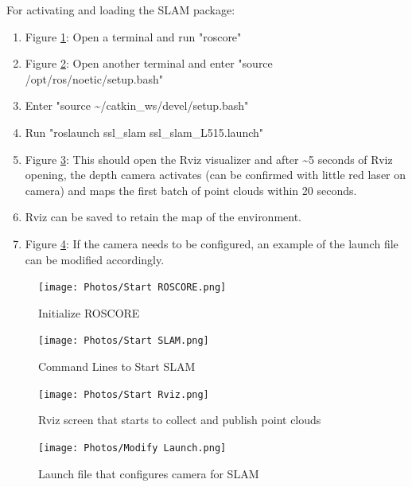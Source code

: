 \documentclass[a4paper, 10pt]{article}
\begin{document}
	For activating and loading the SLAM package:
	\begin{enumerate}
		\item Figure \ref{start_ROSCORE}: Open a terminal and run "roscore" 
		\item Figure \ref{start_SLAM}: Open another terminal and enter "source /opt/ros/noetic/setup.bash" 
		\item Enter "source \~{}/catkin\_{}ws/devel/setup.bash"
		\item Run "roslaunch ssl\_{}slam ssl\_{}slam\_{}L515.launch"
		\item Figure \ref{start_Rviz}: This should open the Rviz visualizer and after \~{}5 seconds of Rviz opening, the depth camera activates (can be confirmed with little red laser on camera) and maps the first batch of point clouds within 20 seconds.
		\item Rviz can be saved to retain the map of the environment. 
		\item Figure \ref{modify_launch}: If the camera needs to be configured, an example of the launch file can be modified accordingly.
	\end{enumerate}

	\begin{figure} [!h]
		\centering
		\texttt{[image: Photos/Start ROSCORE.png]}
		\caption{Initialize ROSCORE}
		\label{start_ROSCORE}
	\end{figure}
		
	\begin{figure} [!h]
		\centering
		\texttt{[image: Photos/Start SLAM.png]}
		\caption{Command Lines to Start SLAM}
		\label{start_SLAM}
	\end{figure}
	
	\begin{figure} [!h]
		\centering
		\texttt{[image: Photos/Start Rviz.png]}
		\caption{Rviz screen that starts to collect and publish point clouds}
		\label{start_Rviz}
	\end{figure}
	
	\begin{figure} [!h]
		\centering
		\texttt{[image: Photos/Modify Launch.png]}
		\caption{Launch file that configures camera for SLAM}
		\label{modify_launch}
	\end{figure}
\end{document}
